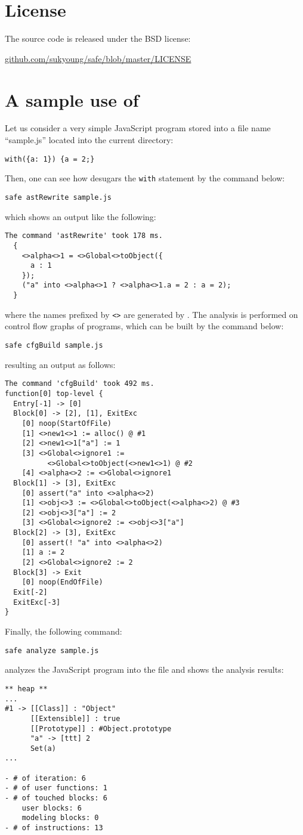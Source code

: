 \section{License}
The \safe source code is released under the BSD license:
\begin{center}
\url{github.com/sukyoung/safe/blob/master/LICENSE}
\end{center}


\section{A sample use of \safe}
\label{sec:usage-example}
Let us consider a very simple JavaScript program stored into a file name ``{sample.js}'' located
into the current directory:
\begin{verbatim}
with({a: 1}) {a = 2;}
\end{verbatim}
Then, one can see how \safe desugars the \texttt{with} statement by the command below:
\begin{verbatim}
safe astRewrite sample.js
\end{verbatim}
which shows an output like the following:
{\small
\begin{verbatim}
The command 'astRewrite' took 178 ms.
  {
    <>alpha<>1 = <>Global<>toObject({
      a : 1
    });
    ("a" into <>alpha<>1 ? <>alpha<>1.a = 2 : a = 2);
  }
\end{verbatim}
}
\noindent
where the names prefixed by \verb!<>! are generated by \safe.
The \safe analysis is performed on control flow graphs of programs,
which can be built by the command below:
\begin{verbatim}
safe cfgBuild sample.js
\end{verbatim}
\noindent
resulting an output as follows:
{\small
\begin{verbatim}
The command 'cfgBuild' took 492 ms.
function[0] top-level {
  Entry[-1] -> [0]
  Block[0] -> [2], [1], ExitExc
    [0] noop(StartOfFile)
    [1] <>new1<>1 := alloc() @ #1
    [2] <>new1<>1["a"] := 1
    [3] <>Global<>ignore1 :=
          <>Global<>toObject(<>new1<>1) @ #2
    [4] <>alpha<>2 := <>Global<>ignore1
  Block[1] -> [3], ExitExc
    [0] assert("a" into <>alpha<>2)
    [1] <>obj<>3 := <>Global<>toObject(<>alpha<>2) @ #3
    [2] <>obj<>3["a"] := 2
    [3] <>Global<>ignore2 := <>obj<>3["a"]
  Block[2] -> [3], ExitExc
    [0] assert(! "a" into <>alpha<>2)
    [1] a := 2
    [2] <>Global<>ignore2 := 2
  Block[3] -> Exit
    [0] noop(EndOfFile)
  Exit[-2]
  ExitExc[-3]
}
\end{verbatim}
}
\noindent
Finally, the following command:
\begin{verbatim}
safe analyze sample.js
\end{verbatim}
analyzes the JavaScript program into the file and shows the analysis results:
{\small
\begin{verbatim}
** heap **
...
#1 -> [[Class]] : "Object"
      [[Extensible]] : true
      [[Prototype]] : #Object.prototype
      "a" -> [ttt] 2
      Set(a)
...

- # of iteration: 6
- # of user functions: 1
- # of touched blocks: 6
    user blocks: 6
    modeling blocks: 0
- # of instructions: 13
\end{verbatim}
}
